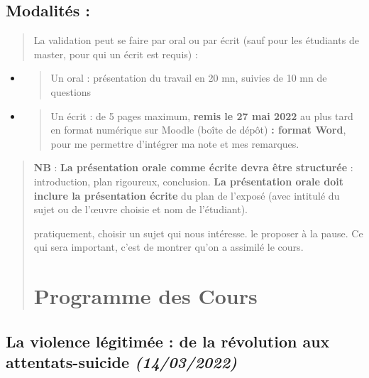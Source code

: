 \hypertarget{modalituxe9s}{%
\subsection{Modalités :}\label{modalituxe9s}}

\begin{quote}
La validation peut se faire par oral ou par écrit (sauf pour les
étudiants de master, pour qui un écrit est requis) :
\end{quote}

\begin{itemize}
\item
  \begin{quote}
  Un oral : présentation du travail en 20 mn, suivies de 10 mn de
  questions
  \end{quote}
\item
  \begin{quote}
  Un écrit : de 5 pages maximum, \textbf{remis le 27 mai 2022} au plus
  tard en format numérique sur Moodle (boîte de dépôt) \textbf{: format
  Word}, pour me permettre d'intégrer ma note et mes remarques.
  \end{quote}
\end{itemize}

\begin{quote}
\textbf{NB} : \textbf{La présentation orale comme écrite devra être
structurée} : introduction, plan rigoureux, conclusion. \textbf{La
présentation orale doit inclure la présentation écrite} du plan de
l'exposé (avec intitulé du sujet ou de l'œuvre choisie et nom de
l'étudiant).



pratiquement, choisir un sujet qui nous intéresse. le proposer à la pause.
Ce qui sera important, c'est de montrer qu'on a assimilé le cours.


\section{Programme des Cours}
\end{quote}


\hypertarget{la-violence-luxe9gitimuxe9e-de-la-ruxe9volution-aux-attentats-suicide-14032022}{%
\subsection{\texorpdfstring{{La violence légitimée : de la
révolution aux attentats-suicide}
\emph{(14/03/2022)}}{La violence légitimée : de la révolution aux attentats-suicide (14/03/2022)}}\label{la-violence-luxe9gitimuxe9e-de-la-ruxe9volution-aux-attentats-suicide-14032022}}


